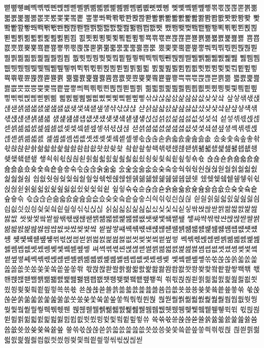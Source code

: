 뼡뼢뼣뼤뼥뼦뼧뼨뼩뼪뼫뼬뼭뼮뼯뼰뼱뼲뼳뼴뼵뼶뼷뼸뼹
뼺뼻뼼뼽뼾뼿뽂뽃뽅뽆뽇뽉뽊뽋뽌뽍뽎뽏뽒뽓뽔뽖뽗뽘뽙
뽚뽛뽜뽝뽞뽟뽠뽡뽢뽣뽤뽥뽦뽧뽨뽩뽪뽫뽬뽭뽮뽯뽰뽱뽲
뽳뽴뽵뽶뽷뽸뽹뽺뽻뽼뽽뽾뽿뾀뾁뾂뾃뾄뾅뾆뾇뾈뾉뾊뾋
뾌뾍뾎뾏뾐뾑뾒뾓뾕뾖뾗뾘뾙뾚뾛뾜뾝뾞뾟뾠뾡뾢뾣뾤뾥
뾦뾧뾨뾩뾪뾫뾬뾭뾮뾯뾱뾲뾳뾴뾵뾶뾷뾸뾹뾺뾻뾼뾽뾾뾿
뿀뿁뿂뿃뿄뿆뿇뿈뿉뿊뿋뿎뿏뿑뿒뿓뿕뿖뿗뿘뿙뿚뿛뿝뿞
뿠뿢뿣뿤뿥뿦뿧뿨뿩뿪뿫뿬뿭뿮뿯뿰뿱뿲뿳뿴뿵뿶뿷뿸뿹
뿺뿻뿼뿽뿾뿿쀀쀁쀂쀃쀄쀅쀆쀇쀈쀉쀊쀋쀌쀍쀎쀏쀐쀑쀒
쀓쀔쀕쀖쀗쀘쀙쀚쀛쀜쀝쀞쀟쀠쀡쀢쀣쀤쀥쀦쀧쀨쀩쀪쀫
쀬쀭쀮쀯쀰쀱쀲쀳쀴쀵쀶쀷쀸쀹쀺쀻쀽쀾쀿쁀쁁쁂쁃쁄쁅
쁆쁇쁈쁉쁊쁋쁌쁍쁎쁏쁐쁒쁓쁔쁕쁖쁗쁙쁚쁛쁝쁞쁟쁡쁢
쁣쁤쁥쁦쁧쁪쁫쁬쁭쁮쁯쁰쁱쁲쁳쁴쁵쁶쁷쁸쁹쁺쁻쁼쁽
쁾쁿삀삁삂삃삄삅삆삇삈삉삊삋삌삍삎삏삒삓삕삖삗삙삚
삛삜삝삞삟삢삤삦삧삨삩삪삫삮삱삲삷삸삹삺삻삾샂샃샄
샆샇샊샋샍샎샏샑샒샓샔샕샖샗샚샞샟샠샡샢샣샦샧샩샪
샫샭샮샯샰샱샲샳샶샸샺샻샼샽샾샿섁섂섃섅섆섇섉섊섋
섌섍섎섏섑섒섓섔섖섗섘섙섚섛섡섢섥섨섩섪섫섮섲섳섴
섵섷섺섻섽섾섿셁셂셃셄셅셆셇셊셎셏셐셑셒셓셖셗셙셚
셛셝셞셟셠셡셢셣셦셪셫셬셭셮셯셱셲셳셵셶셷셹셺셻셼
셽셾셿솀솁솂솃솄솆솇솈솉솊솋솏솑솒솓솕솗솘솙솚솛솞
솠솢솣솤솦솧솪솫솭솮솯솱솲솳솴솵솶솷솸솹솺솻솼솾솿
쇀쇁쇂쇃쇅쇆쇇쇉쇊쇋쇍쇎쇏쇐쇑쇒쇓쇕쇖쇙쇚쇛쇜쇝쇞
쇟쇡쇢쇣쇥쇦쇧쇩쇪쇫쇬쇭쇮쇯쇲쇴쇵쇶쇷쇸쇹쇺쇻쇾쇿
숁숂숃숅숆숇숈숉숊숋숎숐숒숓숔숕숖숗숚숛숝숞숡숢숣
숤숥숦숧숪숬숮숰숳숵숶숷숸숹숺숻숼숽숾숿쉀쉁쉂쉃쉄
쉅쉆쉇쉉쉊쉋쉌쉍쉎쉏쉒쉓쉕쉖쉗쉙쉚쉛쉜쉝쉞쉟쉡쉢쉣
쉤쉦쉧쉨쉩쉪쉫쉮쉯쉱쉲쉳쉵쉶쉷쉸쉹쉺쉻쉾슀슂슃슄슅
슆슇슊슋슌슍슎슏슑슒슓슔슕슖슗슙슚슜슞슟슠슡슢슣슦
슧슩슪슫슮슯슰슱슲슳슶슸슺슻슼슽슾슿싀싁싂싃싄싅싆
싇싈싉싊싋싌싍싎싏싐싑싒싓싔싕싖싗싘싙싚싛싞싟싡싢
싥싦싧싨싩싪싮싰싲싳싴싵싷싺싽싾싿쌁쌂쌃쌄쌅쌆쌇쌊
쌋쌎쌏쌐쌑쌒쌖쌗쌙쌚쌛쌝쌞쌟쌠쌡쌢쌣쌦쌧쌪쌫쌬쌭쌮
쌯쌰쌱쌲쌳쌴쌵쌶쌷쌸쌹쌺쌻쌼쌽쌾쌿썀썁썂썃썄썆썇썈
썉썊썋썌썍썎썏썐썑썒썓썔썕썖썗썘썙썚썛썜썝썞썟썠썡
썢썣썤썥썦썧썪썫썭썮썯썱썳썴썵썶썷썺썻썾썿쎀쎁쎂쎃
쎅쎆쎇쎉쎊쎋쎍쎎쎏쎐쎑쎒쎓쎔쎕쎖쎗쎘쎙쎚쎛쎜쎝쎞쎟
쎠쎡쎢쎣쎤쎥쎦쎧쎨쎩쎪쎫쎬쎭쎮쎯쎰쎱쎲쎳쎴쎵쎶쎷쎸
쎹쎺쎻쎼쎽쎾쎿쏁쏂쏃쏄쏅쏆쏇쏈쏉쏊쏋쏌쏍쏎쏏쏐쏑쏒
쏓쏔쏕쏖쏗쏚쏛쏝쏞쏡쏣쏤쏥쏦쏧쏪쏫쏬쏮쏯쏰쏱쏲쏳쏶
쏷쏹쏺쏻쏼쏽쏾쏿쐀쐁쐂쐃쐄쐅쐆쐇쐉쐊쐋쐌쐍쐎쐏쐑쐒
쐓쐔쐕쐖쐗쐘쐙쐚쐛쐜쐝쐞쐟쐠쐡쐢쐣쐥쐦쐧쐨쐩쐪쐫쐭
쐮쐯쐱쐲쐳쐵쐶쐷쐸쐹쐺쐻쐾쐿쑀쑁쑂쑃쑄쑅쑆쑇쑉쑊쑋
쑌쑍쑎쑏쑐쑑쑒쑓쑔쑕쑖쑗쑘쑙쑚쑛쑜쑝쑞쑟쑠쑡쑢쑣쑦
쑧쑩쑪쑫쑭쑮쑯쑰쑱쑲쑳쑶쑷쑸쑺쑻쑼쑽쑾쑿쒁쒂쒃쒄쒅
쒆쒇쒈쒉쒊쒋쒌쒍쒎쒏쒐쒑쒒쒓쒕쒖쒗쒘쒙쒚쒛쒝쒞쒟쒠
쒡쒢쒣쒤쒥쒦쒧쒨쒩쒪쒫쒬쒭쒮쒯쒰쒱쒲쒳쒴쒵쒶쒷쒹쒺
쒻쒽쒾쒿쓀쓁쓂쓃쓄쓅쓆쓇쓈쓉쓊쓋쓌쓍쓎쓏쓐쓑쓒쓓쓔
쓕쓖쓗쓘쓙쓚쓛쓜쓝쓞쓟쓠쓡쓢쓣쓤쓥쓦쓧쓨쓪쓫쓬쓭쓮
쓯쓲쓳쓵쓶쓷쓹쓻쓼쓽쓾씂씃씄씅씆씇씈씉씊씋씍씎씏씑
씒씓씕씖씗씘씙씚씛씝씞씟씠씡씢씣씤씥씦씧씪씫씭씮씯
